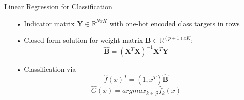 \documentclass{beamer}
\begin{document}
\begin{frame}{Linear Regression for Classification}
\begin{itemize}

\item[•] Indicator matrix $\mathbf{Y} \in \mathbb{R}^{NxK}$ with one-hot encoded class targets in rows

\vspace{0.2cm}
\item[•] Closed-form solution for weight matrix $\mathbf{B} \in \mathbb{R}^{(p+1)xK}$:
\begin{equation*}
\hat{\mathbf{B}} = (\mathbf{X}^T\mathbf{X})^{-1}\mathbf{X}^T\mathbf{Y}
\end{equation*}

\vspace{0.2cm}
\item[•] Classification via 
\begin{equation*}
\hat{f}(x)^T=(1,x^T)\hat{\mathbf{B}}
\end{equation*}
\begin{equation*}
\hat{G}(x) = argmax_{k \in \mathcal{G}} \hat{f}_k(x)
\end{equation*}

\end{itemize}
\end{frame}
\end{document}
